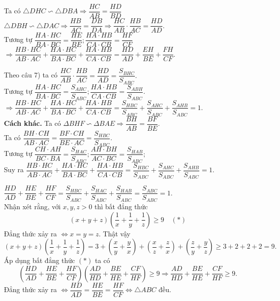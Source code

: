 \begin{bt}
{\begin{listEX}
\item Ta có $\triangle DHC\backsim\triangle DBA\Rightarrow \dfrac{HC}{AB}=\dfrac{HD}{BD} $\\
$ \triangle DBH \backsim \triangle DAC\Rightarrow \dfrac{HB}{AC}=\dfrac{DB}{DA}\Rightarrow \dfrac{HC}{AB}\cdot\dfrac{HB}{AC} =\dfrac{HD}{AD}. $\\
Tương tự $ \dfrac{HA\cdot HC}{BA\cdot BC}=\dfrac{HE}{BE};\dfrac{HA\cdot HB}{CA\cdot CB} =\dfrac{HF}{CF} $\\
$ \Rightarrow\dfrac{HB\cdot HC}{AB\cdot AC}+\dfrac{HA\cdot HC}{BA\cdot BC}+\dfrac{HA\cdot HB}{CA\cdot CB} =\dfrac{HD}{AD}+\dfrac{EH}{BE}+\dfrac{FH}{CF}. $
\item Theo câu 7) ta có $ \dfrac{HC}{AB}\cdot \dfrac{HB}{AC} =\dfrac{HD}{AD}=\dfrac{S_{BHC}}{S_{ABC}}.$\\
Tương tự $ \dfrac{HA\cdot HC}{BA\cdot BC} =\dfrac{S_{AHC}}{S_{ABC}}; \dfrac{HA\cdot HB }{CA\cdot CB} =\dfrac{S_{ABH}}{S_{ABC}}. $\\
$ \Rightarrow \dfrac{HB\cdot HC}{AB\cdot AC}+\dfrac{HA\cdot HC}{BA\cdot BC}+\dfrac{HA\cdot HB}{CA \cdot CB} =\dfrac{S_{HBC}}{S_{ABC}}+\dfrac{S_{AHC}}{S_{ABC}}+\dfrac{S_{AHB}}{S_{ABC}} =1. $\\
\textbf{Cách khác.} Ta có $ \Delta BHF \backsim \Delta BAE\Rightarrow \dfrac{BH}{AB}=\dfrac{BF}{BE}. $\\
Ta có $ \dfrac{BH\cdot CH}{AB\cdot AC}=\dfrac{BF\cdot CH}{BE\cdot AC} =\dfrac{S_{HBC}}{S_{ABC}}. $\\
Tương tự $ \dfrac{CH\cdot AH}{BC\cdot BA}= \dfrac{S_{HAC}}{S_{ABC}}; \dfrac{AH\cdot BH}{AC\cdot BC} =\dfrac{S_{HAB}}{S_{ABC}}; $\\
Suy ra $ \dfrac{HB\cdot HC}{AB\cdot AC}+\dfrac{HA\cdot HC}{BA\cdot BC}+\dfrac{HA\cdot HB}{CA \cdot CB} =\dfrac{S_{HBC}}{S_{ABC}}+\dfrac{S_{AHC}}{S_{ABC}}+\dfrac{S_{AHB}}{S_{ABC}} =1. $
\item $ \dfrac{HD}{AD}+\dfrac{HE}{BE}+\dfrac{HF}{CF}=\dfrac{S_{HBC}}{S_{ABC}}+\dfrac{S_{HAC}}{S_{ABC}}+\dfrac{S_{HAB}}{S_{ABC}}=\dfrac{S_{ABC}}{S_{ABC}}=1. $\\
Nhận xét rằng, với $ x,y,z >0 $ thì bất đẳng thức $$ \left(x+y+z\right)\left(\dfrac{1}{x}+\dfrac{1}{y}+\dfrac{1}{z}\right) \ge 9  \quad (*)  $$ 
Đẳng thức xảy ra $ \Leftrightarrow x=y=z. $ Thật vậy
$$ (x+y+z)\left( \dfrac{1}{x}+\dfrac{1}{y}+\dfrac{1}{z}\right) =3+\left( \dfrac{x}{y}+\dfrac{y}{x }\right)+\left(\dfrac{x}{z}+\dfrac{z}{x} \right)+\left( \dfrac{z}{y}+\dfrac{y}{z}\right) \ge 3+2+2+2=9. $$
Áp dụng bất đẳng thức $(*)$ ta có
$$ \left(\dfrac{HD}{AD}+\dfrac{HE}{BE}+\dfrac{HF}{CF}\right)\left( \dfrac{AD}{HD}+\dfrac{BE}{HE}+\dfrac{CF}{HF}\right) \ge 9 \Rightarrow \dfrac{AD}{HD}+\dfrac{BE}{HE}+\dfrac{CF}{HF}\ge 9.  $$
Đẳng thức xảy ra $ \Leftrightarrow \dfrac{HD}{AD} =\dfrac{HE}{BE}= \dfrac{HF}{CF}\Leftrightarrow \triangle ABC$ đều.


\end{listEX}}
\end{bt}
